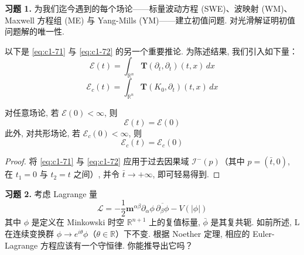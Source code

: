 \textbf{习题 1.} 为我们迄今遇到的每个场论——标量波动方程 (SWE)、波映射 (WM)、Maxwell 方程组 (ME) 与 Yang-Mills (YM)——建立初值问题. 对光滑解证明初值问题解的唯一性. 

以下是 \eqref{eq:c1-71} 与 \eqref{eq:c1-72} 的另一个重要推论. 为陈述结果, 我们引入如下量：
\begin{equation}
\mathcal{E}(t) = \int_{\mathbb{R}^n}\mathbf{T}(\partial_t, \partial_t)(t, x)\, dx\label{eq:c1-73}
\end{equation}
\begin{equation}
\mathcal{E}_c(t) = \int_{\mathbb{R}^n}\mathbf{T}(K_0, \partial_t)(t, x)\, dx\label{eq:c1-74}
\end{equation}

\begin{theorem}[全局能量]\label{thm:c1-3.4}
对任意场论, 若 $\mathcal{E}(0) < \infty$, 则
\begin{equation}
\mathcal{E}(t) = \mathcal{E}(0)\label{eq:c1-75}
\end{equation}
此外, 对共形场论, 若 $\mathcal{E}_c(0) < \infty$, 则
\begin{equation}
\mathcal{E}_c(t) = \mathcal{E}_c(0)\label{eq:c1-76}
\end{equation}
\end{theorem}

\begin{proof}
将 \eqref{eq:c1-71} 与 \eqref{eq:c1-72} 应用于过去因果域 $\mathcal{I}^-(p)$（其中 $p = (\bar{t}, 0)$, 在 $t_1 = 0$ 与 $t_2 = t$ 之间）, 并令 $\bar{t} \to +\infty$, 即可轻易得到. 
\end{proof}

\textbf{习题 2.} 考虑 Lagrange 量
\[
\mathcal{L} = -\frac{1}{2}\mathbf{m}^{\alpha\beta}\partial_\alpha\phi\, \overline{\partial_\beta\phi} - V(|\phi|)
\]
其中 $\phi$ 是定义在 Minkowski 时空 $\mathbb{R}^{n+1}$ 上的复值标量, $\bar{\phi}$ 是其复共轭. 如前所述, L 在连续变换群 $\phi \to e^{i\theta}\phi$（$\theta \in \mathbb{R}$）下不变. 根据 Noether 定理, 相应的 Euler-Lagrange 方程应该有一个守恒律. 你能推导出它吗？


